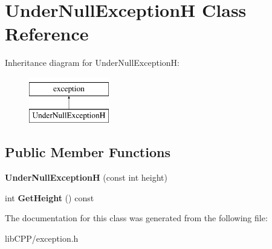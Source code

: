 \hypertarget{classUnderNullExceptionH}{\section{Under\-Null\-Exception\-H Class Reference}
\label{classUnderNullExceptionH}
}
Inheritance diagram for Under\-Null\-Exception\-H\-:\begin{figure}[H]
\begin{center}
\leavevmode
\includegraphics[height=2.000000cm]{classUnderNullExceptionH}
\end{center}
\end{figure}
\subsection*{Public Member Functions}
\begin{DoxyCompactItemize}
\item 
\hypertarget{classUnderNullExceptionH_ab3261fa1162c78661e6e466da1f278be}{{\bfseries Under\-Null\-Exception\-H} (const int height)}\label{classUnderNullExceptionH_ab3261fa1162c78661e6e466da1f278be}

\item 
\hypertarget{classUnderNullExceptionH_a4902796ebe39498e25d27accc2e85a15}{int {\bfseries Get\-Height} () const }\label{classUnderNullExceptionH_a4902796ebe39498e25d27accc2e85a15}

\end{DoxyCompactItemize}


The documentation for this class was generated from the following file\-:\begin{DoxyCompactItemize}
\item 
lib\-C\-P\-P/exception.\-h\end{DoxyCompactItemize}
